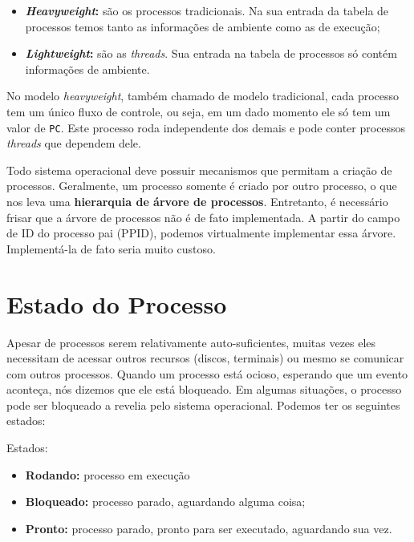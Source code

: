 \begin{itemize}
  \item \textbf{\textit{Heavyweight}:} são os processos tradicionais. Na sua entrada da tabela de processos temos tanto as informações de ambiente como as de execução;
  \item \textbf{\textit{Lightweight}:} são as \textit{threads}. Sua entrada na tabela de processos só contém informações de ambiente.
\end{itemize}

No modelo \textit{heavyweight}, também chamado de modelo tradicional, cada processo tem um único fluxo de controle, ou seja, em um dado momento ele só tem um valor de \texttt{PC}. Este processo roda independente dos demais e pode conter processos \textit{threads} que dependem dele.

Todo sistema operacional deve possuir mecanismos que permitam a criação de processos. Geralmente, um processo somente é criado por outro processo, o que nos leva uma \textbf{hierarquia de árvore de processos}. Entretanto, é necessário frisar que a árvore de processos não é de fato implementada. A partir do campo de ID do processo pai (PPID), podemos virtualmente implementar essa árvore. Implementá-la de fato seria muito custoso.






















\section{Estado do Processo}
Apesar de processos serem relativamente auto-suficientes, muitas vezes eles necessitam de acessar outros recursos (discos, terminais) ou mesmo se comunicar com outros processos. Quando um processo está ocioso, esperando que um evento aconteça, nós dizemos que ele está bloqueado. Em algumas situações, o processo pode ser bloqueado a revelia pelo sistema operacional. Podemos ter os seguintes estados:

Estados:
\begin{itemize}
  \item \textbf{Rodando:} processo em execução
  \item \textbf{Bloqueado:} processo parado, aguardando alguma coisa;
  \item \textbf{Pronto:} processo parado, pronto para ser executado, aguardando sua vez.
\end{itemize}

